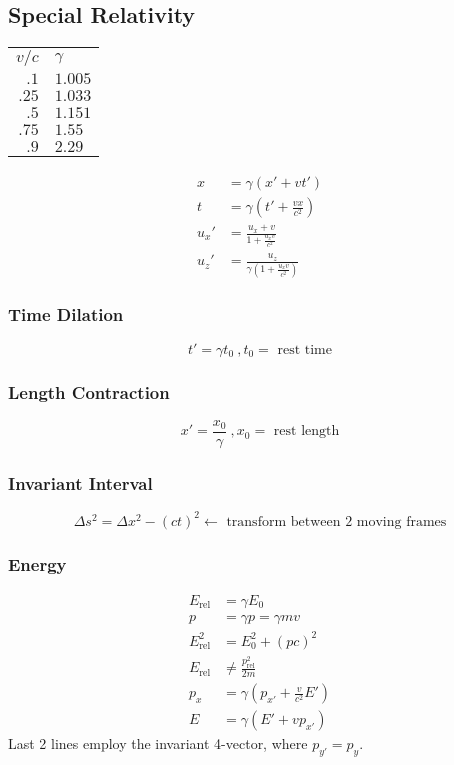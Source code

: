 \documentclass[10pt,letter]{article}
\begin{document}
\subsection{Special Relativity}

\begin{tabular}{ r l }
  $v/c$ & $\gamma$\\
  $.1$ & $1.005$\\
  $.25$ & $1.033$\\
  $.5$ & $1.151$\\
  $.75$ & $1.55$\\
  $.9$ & $2.29$\\
\end{tabular}

\begin{align}
 x &= \gamma(x' + vt')\\
 t &= \gamma \left( t' + \frac{vx}{c^2} \right) \\
 u_x' &= \frac{u_x + v}{1+\frac{u_xv}{c^2}}\\
 u_z' &= \frac{u_z}{ \gamma \left( 1+\frac{u_xv}{c^2} \right)}
\end{align}

\subsubsection{Time Dilation}
\begin{equation}
 t' = \gamma t_0~,t_0 =\textrm{ rest time}
\end{equation}
\subsubsection{Length Contraction}
\begin{equation}
 x' = \frac{x_0}{\gamma}~, x_0= \textrm{ rest length}
\end{equation}

\subsubsection{Invariant Interval}
\begin{equation}
 \Delta s^2 = \Delta x^2 -(ct)^2 \leftarrow \textrm{ transform between 2 moving frames}
\end{equation}

\subsubsection{Energy}
\begin{align}
 E_{\textrm{rel}} &= \gamma E_0\\
p &= \gamma p = \gamma mv\\
E_{\textrm{rel}}^2 &= E_0^2 + (pc)^2\\
E_{\textrm{rel}} &\neq \frac{p^2_{\textrm{rel}}}{2m}\\
p_x &= \gamma \left( p_{x'} + \frac{v}{c^2}E' \right)\\
E &= \gamma \left( E' + vp_{x'} \right) 
\end{align}
Last 2 lines employ the invariant 4-vector, where $p_{y'} = p_y$.
\end{document}
